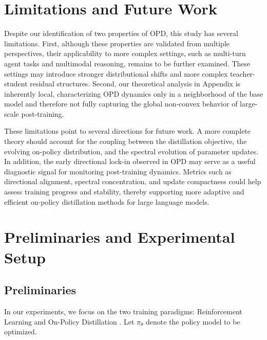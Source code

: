 \documentclass{article}
\begin{document}
\section{Limitations and Future Work}
\label{Limitation}

Despite our identification of two properties of OPD, this study has several limitations. First, although these properties are validated from multiple perspectives, their applicability to more complex settings, such as multi-turn agent tasks and multimodal reasoning, remains to be further examined. These settings may introduce stronger distributional shifts and more complex teacher-student residual structures. Second, our theoretical analysis in Appendix is inherently local, characterizing OPD dynamics only in a neighborhood of the base model and therefore not fully capturing the global non-convex behavior of large-scale post-training.

These limitations point to several directions for future work. A more complete theory should account for the coupling between the distillation objective, the evolving on-policy distribution, and the spectral evolution of parameter updates. In addition, the early directional lock-in observed in OPD may serve as a useful diagnostic signal for monitoring post-training dynamics. Metrics such as directional alignment, spectral concentration, and update compactness could help assess training progress and stability, thereby supporting more adaptive and efficient on-policy distillation methods for large language models.




\clearpage
\section{Preliminaries and Experimental Setup}
\label{Preliminaries and Experimental Setup}

\subsection{Preliminaries}
In our experiments, we focus on the two training paradigms: Reinforcement Learning \citep{Zhang2025ASO} and On-Policy Distillation \citep{Kim2026WhyDS}. Let $\pi_{\theta}$ denote the policy model to be optimized.
\end{document}
